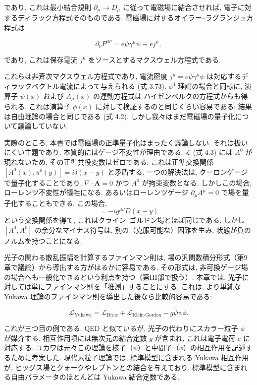 \documentclass[a4paper,12pt]{article}
\begin{document}
であり, これは最小結合規則 $\partial_\mu \to D_\mu$ に従って電磁場に結合させれば, 
電子に対するディラック方程式そのものである. 
電磁場に対するオイラー--ラグランジュ方程式は

\begin{equation*}
\partial_\nu F^{\mu\nu} = e \bar{\psi}\gamma^\mu \psi \equiv e j^\mu ,
\end{equation*}

であり, これは保存電流 $j^\mu$ をソースとするマクスウェル方程式である.

これらは非斉次マクスウェル方程式であり, 電流密度 
$j^\mu = e \bar{\psi}\gamma^\mu \psi$ は対応するディラックベクトル電流によって与えられる (式 3.73). 
$\phi^4$ 理論の場合と同様に, 演算子 $\psi(x)$ および $A_\mu(x)$ の運動方程式は
ハイゼンベルクの方程式からも得られる. 
これは演算子 $\phi(x)$ に対して検証するのと同じくらい容易である; 
結果は自由理論の場合と同じである (式 4.2). 
しかし我々はまだ電磁場の量子化について議論していない.

実際のところ, 本書では電磁場の正準量子化はまったく議論しない. 
それは扱いにくい主題であり, 本質的にはゲージ不変性が理由である. 
$\mathcal{L}$ (式 4.3) には $A^0$ が現れないため, その正準共役変数はゼロである. 
これは正準交換関係 $[A^0(x), \pi^0(y)] = i\delta(x-y)$ と矛盾する. 
一つの解決法は, クーロンゲージで量子化することであり, 
$\nabla \cdot \mathbf{A} = 0$ かつ $A^0$ が拘束変数となる. 
しかしこの場合, ローレンツ不変性が犠牲になる. 
あるいはローレンツゲージ $\partial_\mu A^\mu = 0$ で場を量子化することもできる. 
この場合, 
\begin{equation*}
[A^\mu(x), A^\nu(y)] = -ig^{\mu\nu}D(x-y)
\end{equation*}
という交換関係を得て, これはクライン--ゴルドン場とほぼ同じである. 
しかし $[A^0, A^0]$ の余分なマイナス符号は, 別の（克服可能な）困難を生み, 
状態が負のノルムを持つことになる.

光子の関わる散乱振幅を計算するファインマン則は, 
場の汎関数積分形式（第9章で議論）から導出する方がはるかに容易である. 
その形式は, 非可換ゲージ場の場合へも一般化できるという利点を持つ（第III部で扱う）. 
本章では, 光子に対しては単にファインマン則を「推測」することにする. 
これは, より単純な Yukawa 理論のファインマン則を導出した後なら比較的容易である:

\begin{equation*}
\mathcal{L}_{\text{Yukawa}} 
= \mathcal{L}_{\text{Dirac}} + \mathcal{L}_{\text{Klein-Gordon}} - g \bar{\psi}\psi \phi .
\end{equation*}

これが三つ目の例である. QED と似ているが, 光子の代わりにスカラー粒子 $\phi$ が媒介する. 
相互作用項には無次元の結合定数 $g$ が含まれ, これは電子電荷 $e$ に対応する. 
ユカワは元々この理論を核子（$\psi$）と中間子（$\phi$）の相互作用を記述するために考案した. 
現代素粒子理論では, 標準模型に含まれる Yukawa 相互作用が, 
ヒッグス場とクォークやレプトンとの結合を与えており, 
標準模型に含まれる自由パラメータのほとんどは Yukawa 結合定数である.
\end{document}
